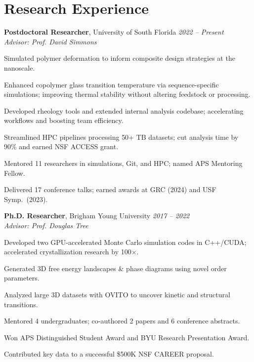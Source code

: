 \documentclass[letterpaper,12pt]{article}
\begin{document}
\section*{Research Experience}

\textbf{Postdoctoral Researcher}, University of South Florida \hfill \textit{2022 – Present} \\
\textit{Advisor: Prof. David Simmons}
\begin{tabitemize}[leftmargin=*]
  \item Simulated polymer deformation to inform composite design strategies at the nanoscale.
  \item Enhanced copolymer glass transition temperature via sequence-specific simulations; improving thermal stability without altering feedstock or processing.
  \item Developed rheology tools and extended internal analysis codebase; accelerating workflows and boosting team efficiency.
  \item Streamlined HPC pipelines processing 50+ TB datasets; cut analysis time by 90\% and earned NSF ACCESS grant.
  \item Mentored 11 researchers in simulations, Git, and HPC; named APS Mentoring Fellow.
  \item Delivered 17 conference talks; earned awards at GRC (2024) and USF Symp.~(2023).
\end{tabitemize}

\textbf{Ph.D. Researcher}, Brigham Young University \hfill \textit{2017 – 2022} \\
\textit{Advisor: Prof. Douglas Tree}
\begin{tabitemize}[leftmargin=*]
  \item Developed two GPU-accelerated Monte Carlo simulation codes in C++/CUDA; accelerated crystallization research by 100×.
  \item Generated 3D free energy landscapes \& phase diagrams using novel order parameters.
  \item Analyzed large 3D datasets with OVITO to uncover kinetic and structural transitions.
  \item Mentored 4 undergraduates; co-authored 2 papers and 6 conference abstracts.%
  \item Won APS Distinguished Student Award and BYU Research Presentation Award.
  \item Contributed key data to a successful \$500K NSF CAREER proposal.
\end{tabitemize}
\end{document}
